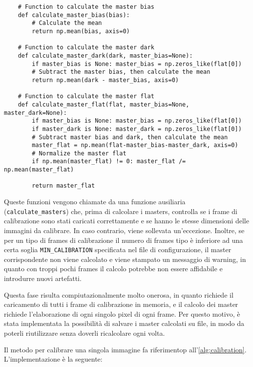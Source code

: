 \begin{lstlisting}
    # Function to calculate the master bias
    def calculate_master_bias(bias):
        # Calculate the mean
        return np.mean(bias, axis=0)

    # Function to calculate the master dark
    def calculate_master_dark(dark, master_bias=None):
        if master_bias is None: master_bias = np.zeros_like(flat[0])
        # Subtract the master bias, then calculate the mean
        return np.mean(dark - master_bias, axis=0)

    # Function to calculate the master flat
    def calculate_master_flat(flat, master_bias=None, master_dark=None):
        if master_bias is None: master_bias = np.zeros_like(flat[0])
        if master_dark is None: master_dark = np.zeros_like(flat[0])
        # Subtract master bias and dark, then calculate the mean
        master_flat = np.mean(flat-master_bias-master_dark, axis=0)   
        # Normalize the master flat
        if np.mean(master_flat) != 0: master_flat /= np.mean(master_flat)
        
        return master_flat
\end{lstlisting}

Queste funzioni vengono chiamate da una funzione ausiliaria (\texttt{calculate\_masters}) che, prima di calcolare i masters, controlla se i frame di calibrazione sono stati caricati correttamente e se hanno le stesse dimensioni delle immagini da calibrare. In caso contrario, viene sollevata un'eccezione. Inoltre, se per un tipo di frames di calibrazione il numero di frames tipo è inferiore ad una certa soglia \texttt{MIN\_CALIBRATION} specificata nel file di configurazione, il master corrispondente non viene calcolato e viene stampato un messaggio di warning, in quanto con troppi pochi frames il calcolo potrebbe non essere affidabile e introdurre nuovi artefatti.

Questa fase risulta compiutazionalmente molto onerosa, in quanto richiede il caricamento di tutti i frame di calibrazione in memoria, e il calcolo dei master richiede l'elaborazione di ogni singolo pixel di ogni frame. Per questo motivo, è stata implementata la possibilità di salvare i master calcolati su file, in modo da poterli riutilizzare senza doverli ricalcolare ogni volta.

Il metodo per calibrare una singola immagine fa riferimentop all'\cref{alg:calibration}. L'implementazione è la seguente:

